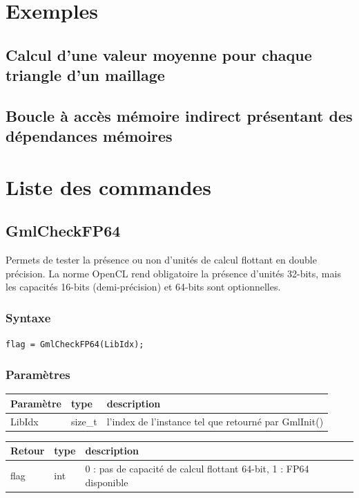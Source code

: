 \documentclass[a4paper,12pt]{article}
\begin{document}
\section{Exemples}

\subsection{Calcul d'une valeur moyenne pour chaque triangle d'un maillage}

\subsection{Boucle à accès mémoire indirect présentant des dépendances mémoires}


%
%

\section{Liste des commandes}

\subsection{GmlCheckFP64}

Permets de tester la présence ou non d'unités de calcul flottant en double précision.
La norme OpenCL rend obligatoire la présence d'unités 32-bits, mais les capacités 16-bits (demi-précision) et 64-bits sont optionnelles.

\subsubsection*{Syntaxe}
{\tt flag = GmlCheckFP64(LibIdx);}
\subsubsection*{Paramètres}

\begin{tabular}{|m{2cm}|m{1.5cm}|m{10.5cm}|}
\hline
Paramètre  & type    & description \\
\hline
LibIdx     & size\_t & l'index de l'instance tel que retourné par GmlInit() \\
\hline
\end{tabular}

\medskip

\begin{tabular}{|m{2cm}|m{1.5cm}|m{10.5cm}|}
\hline
Retour     & type   & description \\
\hline
flag       & int    & 0 : pas de capacité de calcul flottant 64-bit, 1 : FP64 disponible \\
\hline
\end{tabular}
\end{document}
